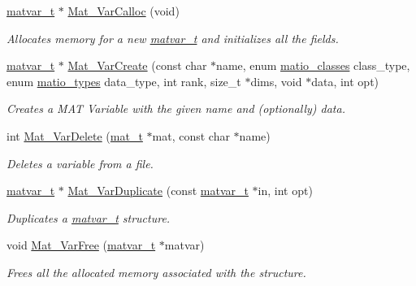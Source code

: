 \begin{DoxyCompactItemize}
\hyperlink{structmatvar__t}{matvar\_\-t} $\ast$ \hyperlink{group__MAT_gae7c9c3699f6e9c31a9c490300013098c}{Mat\_\-VarCalloc} (void)
\begin{DoxyCompactList}\small\item\em Allocates memory for a new \hyperlink{structmatvar__t}{matvar\_\-t} and initializes all the fields. \item\end{DoxyCompactList}\item 
\hyperlink{structmatvar__t}{matvar\_\-t} $\ast$ \hyperlink{group__MAT_ga1c54a84bb4d810c6fccdb8869489eac4}{Mat\_\-VarCreate} (const char $\ast$name, enum \hyperlink{group__MAT_gad4d60ae7b709fc81bfd744fb4c857c40}{matio\_\-classes} class\_\-type, enum \hyperlink{group__MAT_gacf7b3b879282b7ab3a51190e49bf3453}{matio\_\-types} data\_\-type, int rank, size\_\-t $\ast$dims, void $\ast$data, int opt)
\begin{DoxyCompactList}\small\item\em Creates a MAT Variable with the given name and (optionally) data. \item\end{DoxyCompactList}\item 
int \hyperlink{group__MAT_gabf139e48d48177e5069338fa2919c60a}{Mat\_\-VarDelete} (\hyperlink{struct__mat__t}{mat\_\-t} $\ast$mat, const char $\ast$name)
\begin{DoxyCompactList}\small\item\em Deletes a variable from a file. \item\end{DoxyCompactList}\item 
\hyperlink{structmatvar__t}{matvar\_\-t} $\ast$ \hyperlink{group__MAT_ga7ef80c5d99d7918b2b09db3bea106ecc}{Mat\_\-VarDuplicate} (const \hyperlink{structmatvar__t}{matvar\_\-t} $\ast$in, int opt)
\begin{DoxyCompactList}\small\item\em Duplicates a \hyperlink{structmatvar__t}{matvar\_\-t} structure. \item\end{DoxyCompactList}\item 
void \hyperlink{group__MAT_ga1d14716f7450530fd1c9d02413787f0e}{Mat\_\-VarFree} (\hyperlink{structmatvar__t}{matvar\_\-t} $\ast$matvar)
\begin{DoxyCompactList}\small\item\em Frees all the allocated memory associated with the structure. \item\end{DoxyCompactList}\item 

\end{DoxyCompactItemize}
